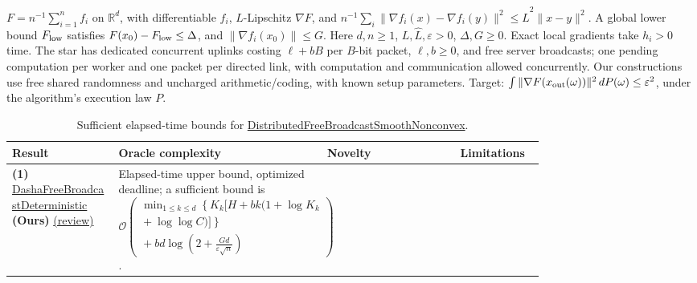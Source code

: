 \begin{table}[tp]
\centering
\caption{Sufficient elapsed-time bounds for \href{https://github.com/k3nfalt/longtails/blob/main/LongTails/Setups/DistributedFreeBroadcastSmoothNonconvex.lean}{DistributedFreeBroadcastSmoothNonconvex}.}\label{tab:DistributedFreeBroadcastSmoothNonconvex}
\parbox{\linewidth}{\footnotesize $F=n^{-1}\sum_{i=1}^n f_i$ on $\mathbb R^d$, with differentiable $f_i$, $L$-Lipschitz $\nabla F$, and $n^{-1}\sum_i\|\nabla f_i(x)-\nabla f_i(y)\|^2\le\widehat L^2\|x-y\|^2$. A global lower bound $F_{\rm low}$ satisfies $F(x_0)-F_{\rm low}\le\Delta$, and $\|\nabla f_i(x_0)\|\le G$. Here $d,n\ge1$, $L,\widehat L,\varepsilon>0$, $\Delta,G\ge0$. Exact local gradients take $h_i>0$ time. The star has dedicated concurrent uplinks costing $\ell+bB$ per $B$-bit packet, $\ell,b\ge0$, and free server broadcasts; one pending computation per worker and one packet per directed link, with computation and communication allowed concurrently. Our constructions use free shared randomness and uncharged arithmetic/coding, with known setup parameters. Target: $\int\|\nabla F(x_{\rm out}(\omega))\|^2\,dP(\omega)\le\varepsilon^2$, under the algorithm's execution law $P$.}\par\smallskip
\begin{threeparttable}
\footnotesize
\setlength{\tabcolsep}{4pt}\renewcommand{\arraystretch}{1.25}
\begin{tabularx}{\linewidth}{@{}>{\raggedright\arraybackslash}p{0.20\linewidth}>{\raggedright\arraybackslash}p{0.32\linewidth}>{\raggedright\arraybackslash}p{0.25\linewidth}>{\raggedright\arraybackslash}X@{}}
\toprule
\textbf{Result} & \textbf{Oracle complexity} & \textbf{Novelty} & \textbf{Limitations} \\
\midrule
\textbf{(1)} \href{https://github.com/k3nfalt/longtails/blob/main/LongTails/Theorems/DashaFreeBroadcastDeterministic.lean}{Dasha\allowbreak Free\allowbreak Broadcast\allowbreak Deterministic} \textbf{(Ours)} \href{https://github.com/k3nfalt/longtails/blob/main/scripts/reviews/DashaFreeBroadcastDeterministic.md}{(review)}
& Elapsed-time upper bound, optimized deadline; a sufficient bound is
$\displaystyle\mathcal{O}\!\left(\begin{gathered}\min_{1\le k\le d}\left\{K_k\bigl[H+bk(1+\log K_k\right.\\ \left.{}+\log\log C)\bigr]\right\}\\
{}+bd\log\!\left(2+\frac{Gd}{\varepsilon\sqrt n}\right)\end{gathered}\right)$.
& & \\

\end{tabularx}
\end{threeparttable}
\end{table}
